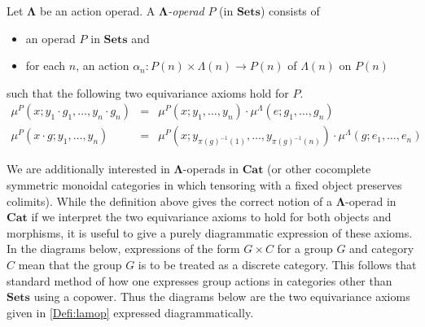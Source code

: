 \documentclass{amsbook} %
\newcommand{\mb}{\mathbf}
\numberwithin{section}{chapter}
\begin{document}
\begin{Defi}\label{Defi:lamop}
Let $\mb{\Lambda}$ be an action operad.  A \textit{$\mb{\Lambda}$-operad} $P$ (in $\mb{Sets}$) consists of
\begin{itemize}
\item an operad $P$ in $\mb{Sets}$ and
\item for each $n$, an action $\alpha_n:P(n) \times \Lambda(n) \rightarrow P(n)$ of $\Lambda(n)$ on $P(n)$
\end{itemize}
such that the following two equivariance axioms hold for $P$.
\[
\begin{array}{rcl}
\mu^{P}(x; y_{1} \cdot g_{1}, \ldots, y_{n} \cdot g_{n}) & = & \mu^{P}(x; y_{1}, \ldots, y_{n}) \cdot \mu^{\Lambda}(e; g_{1}, \ldots, g_{n})  \\
\mu^{P}(x \cdot g; y_{1}, \ldots, y_{n}) &  = & \mu^{P}(x; y_{\pi(g)^{-1}(1)}, \ldots, y_{\pi(g)^{-1}(n)}) \cdot \mu^{\Lambda}(g; e_{1}, \ldots, e_{n})
\end{array}
\]
\end{Defi}

We are additionally interested in $\mb{\Lambda}$-operads in $\mb{Cat}$ (or other cocomplete symmetric monoidal categories in which tensoring with a fixed object preserves colimits).  While the definition above gives the correct notion of a $\mb{\Lambda}$-operad in $\mb{Cat}$ if we interpret the two equivariance axioms to hold for both objects and morphisms, it is useful to give a purely diagrammatic expression of these axioms.  In the diagrams below, expressions of the form $G \times C$ for a group $G$ and category $C$ mean that the group $G$ is to be treated as a discrete category.  This follows that standard method of how one expresses group actions in categories other than $\mb{Sets}$ using a copower.  Thus the diagrams below are the two equivariance axioms given in \cref{Defi:lamop} expressed diagrammatically.
\end{document}
